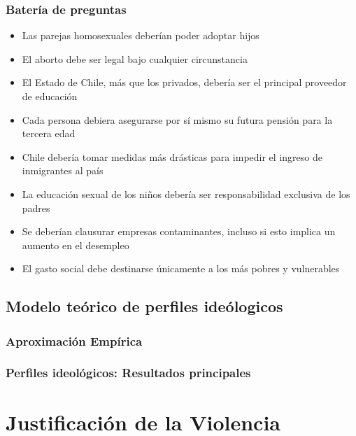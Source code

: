 \documentclass[
  12pt,
  openany]{book}
\providecommand{\tightlist}{%
  \setlength{\itemsep}{0pt}\setlength{\parskip}{0pt}}
\begin{document}
\hypertarget{bateruxeda-de-preguntas}{%
\subsection{Batería de preguntas}\label{bateruxeda-de-preguntas}}

\begin{itemize}
\tightlist
\item
  Las parejas homosexuales deberían poder adoptar hijos
\item
  El aborto debe ser legal bajo cualquier circunstancia
\item
  El Estado de Chile, más que los privados, debería ser el principal proveedor de educación
\item
  Cada persona debiera asegurarse por sí mismo su futura pensión para la tercera edad
\item
  Chile debería tomar medidas más drásticas para impedir el ingreso de inmigrantes al país
\item
  La educación sexual de los niños debería ser responsabilidad exclusiva de los padres
\item
  Se deberían clausurar empresas contaminantes, incluso si esto implica un aumento en el desempleo
\item
  El gasto social debe destinarse únicamente a los más pobres y vulnerables
\end{itemize}

\hypertarget{modelo-teuxf3rico-de-perfiles-ideuxf3logicos}{%
\section{Modelo teórico de perfiles ideólogicos}\label{modelo-teuxf3rico-de-perfiles-ideuxf3logicos}}

\hypertarget{aproximaciuxf3n-empuxedrica}{%
\subsection{Aproximación Empírica}\label{aproximaciuxf3n-empuxedrica}}

\hypertarget{perfiles-ideoluxf3gicos-resultados-principales}{%
\subsection{Perfiles ideológicos: Resultados principales}\label{perfiles-ideoluxf3gicos-resultados-principales}}

\hypertarget{justificaciuxf3n-de-la-violencia}{%
\chapter{Justificación de la Violencia}\label{justificaciuxf3n-de-la-violencia}}
\end{document}
